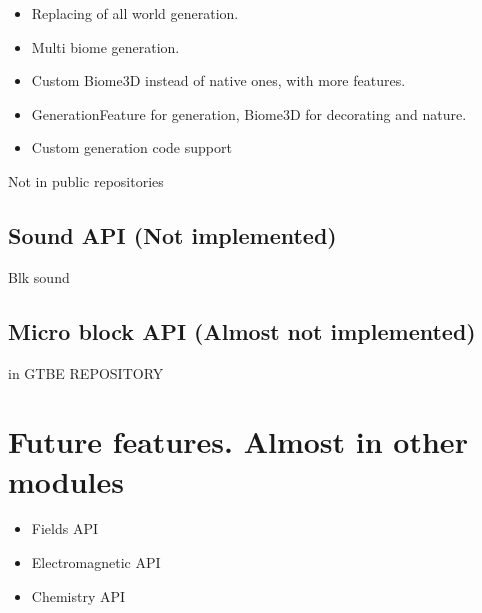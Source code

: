 \documentclass[12pt]{article}
\begin{document}
	\begin{itemize}
		\item Replacing of all world generation.
		\item Multi biome generation.
		\item Custom Biome3D instead of native ones, with more features.
		\item GenerationFeature for generation, Biome3D for decorating and nature.
		\item Custom generation code support
	\end{itemize}

	Not in public repositories

	\subsection{Sound API (Not implemented)} 

	Blk sound

	\subsection{Micro block API (Almost not implemented)} 
	
	in GTBE REPOSITORY

	\section{Future features. Almost in other modules}

	\begin{itemize}
		\item Fields API
		\item Electromagnetic API
		\item Chemistry API
	\end{itemize}
\end{document}
